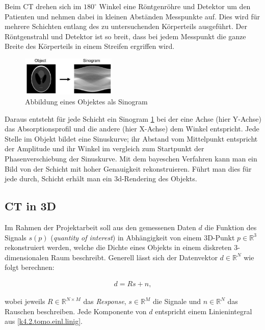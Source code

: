 Beim CT drehen sich im $180^\circ$ Winkel eine Röntgenröhre und Detektor um den Patienten und nehmen dabei in kleinen Abständen Messpunkte auf. Dies wird für mehrere Schichten entlang des zu untersuchenden Körperteils ausgeführt. Der Röntgenstrahl und Detektor ist so breit, dass bei jedem Messpunkt die ganze Breite des Körperteils in einem Streifen ergriffen wird.

\begin{figure}
 \centering
 \includegraphics[width=0.4\textwidth]{k4.2/backprojektion.png}
 \caption{Abbildung eines Objektes als Sinogram}
 \label{k4.2.tomo.ct.bp}
\end{figure}

Daraus entsteht für jede Schicht ein Sinogram \cref{k4.2.tomo.ct.bp} bei der eine Achse (hier Y-Achse) das Absorptionsprofil und die andere (hier X-Achse) dem Winkel entspricht. Jede Stelle im Objekt bildet eine Sinuskurve; ihr Abstand vom Mittelpunkt entspricht der Amplitude und ihr Winkel im vergleich zum Startpunkt der Phasenverschiebung der Sinuskurve. Mit dem bayeschen Verfahren  kann man ein Bild von der Schicht mit hoher Genauigkeit rekonstruieren. Führt man dies für jede durch, Schicht erhält man ein 3d-Rendering des Objekts.


\subsection{CT in 3D}

Im Rahmen der Projektarbeit soll aus den gemessenen Daten $d$ die Funktion des Signals $s(p)$ (\emph{quantity of interest}) in Abhängigkeit von einem 3D-Punkt $p \in \mathbb{R}^3$ rekonstruiert werden, welche die Dichte eines Objekts in einem diskreten 3-dimensionalen Raum beschreibt. Generell lässt sich der Datenvektor $d \in \mathbb{R}^N$ wie folgt berechnen:

\begin{equation}
  \begin{aligned}
    d = Rs + n,
  \end{aligned}
\end{equation}

wobei jeweils $R \in \mathbb{R}^{N \times M}$ das \emph{Response}, $s \in \mathbb{R}^M$ die Signale und $n \in \mathbb{R}^N$ das Rauschen beschreiben. Jede Komponente von $d$ entspricht einem Linienintegral aus \cref{k4.2.tomo.einl.linig}.

